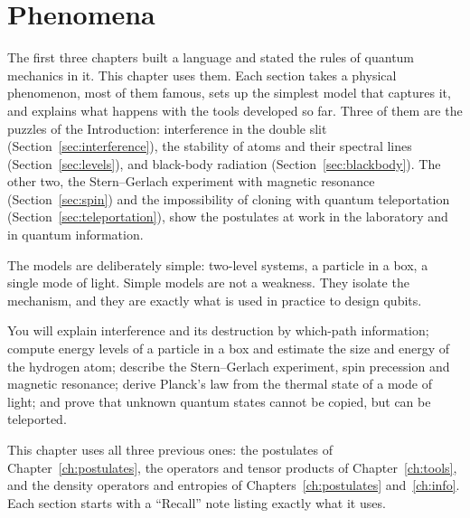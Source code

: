 \chapter{Phenomena}\label{ch:phenomena}

The first three chapters built a language and stated the rules of quantum mechanics in it. This chapter uses them. Each section takes a physical phenomenon, most of them famous, sets up the simplest model that captures it, and explains what happens with the tools developed so far. Three of them are the puzzles of the Introduction: interference in the double slit (Section~\ref{sec:interference}), the stability of atoms and their spectral lines (Section~\ref{sec:levels}), and black-body radiation (Section~\ref{sec:blackbody}). The other two, the Stern--Gerlach experiment with magnetic resonance (Section~\ref{sec:spin}) and the impossibility of cloning with quantum teleportation (Section~\ref{sec:teleportation}), show the postulates at work in the laboratory and in quantum information.

The models are deliberately simple: two-level systems, a particle in a box, a single mode of light. Simple models are not a weakness. They isolate the mechanism, and they are exactly what is used in practice to design qubits.

\begin{objectives}
  You will explain interference and its destruction by which-path information; compute energy levels of a particle in a box and estimate the size and energy of the hydrogen atom; describe the Stern--Gerlach experiment, spin precession and magnetic resonance; derive Planck's law from the thermal state of a mode of light; and prove that unknown quantum states cannot be copied, but can be teleported.
\end{objectives}

\begin{whereitsits}
  This chapter uses all three previous ones: the postulates of Chapter~\ref{ch:postulates}, the operators and tensor products of Chapter~\ref{ch:tools}, and the density operators and entropies of Chapters~\ref{ch:postulates} and~\ref{ch:info}. Each section starts with a ``Recall'' note listing exactly what it uses.
\end{whereitsits}







